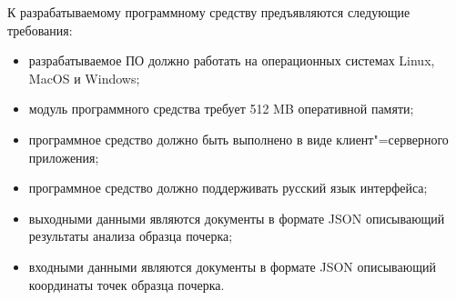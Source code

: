К разрабатываемому программному средству предъявляются следующие требования:
\begin{itemize}
  \item разрабатываемое ПО должно работать на операционных системах Linux, MacOS и Windows;
  \item модуль программного средства требует 512 MB оперативной памяти;
  \item программное средство должно быть выполнено в виде клиент"=серверного приложения;
  \item программное средство должно поддерживать русский язык \mbox{интерфейса;}
  \item выходными данными являются документы в формате JSON описывающий результаты анализа образца почерка;
  \item входными данными являются документы в формате JSON описывающий координаты точек образца почерка.
\end{itemize}